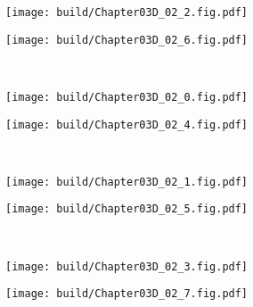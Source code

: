 \begin{Figure}[折叠式共源共栅放大器的特性]
    \begin{FigureSub}
        \texttt{[image: build/Chapter03D\_02\_2.fig.pdf]}
    \end{FigureSub} \hspace{0.3cm}
    \begin{FigureSub}
        \texttt{[image: build/Chapter03D\_02\_6.fig.pdf]}
    \end{FigureSub}\\ \vspace{0.5cm}
    \begin{FigureSub}
        \texttt{[image: build/Chapter03D\_02\_0.fig.pdf]}
    \end{FigureSub} \hspace{0.3cm}
    \begin{FigureSub}
        \texttt{[image: build/Chapter03D\_02\_4.fig.pdf]}
    \end{FigureSub}\\ \vspace{0.5cm}
    \begin{FigureSub}
        \texttt{[image: build/Chapter03D\_02\_1.fig.pdf]}
    \end{FigureSub}
    \begin{FigureSub}
        \texttt{[image: build/Chapter03D\_02\_5.fig.pdf]}
    \end{FigureSub}\\ \vspace{0.5cm}
    \begin{FigureSub}
        \texttt{[image: build/Chapter03D\_02\_3.fig.pdf]}
    \end{FigureSub}
    \begin{FigureSub}
        \texttt{[image: build/Chapter03D\_02\_7.fig.pdf]}
    \end{FigureSub}
\end{Figure}

